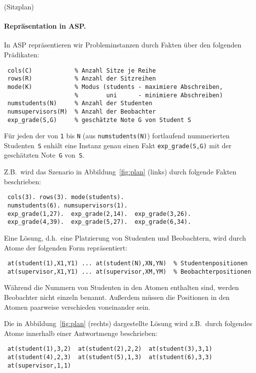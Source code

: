 \documentclass[a4paper,12pt,ngerman]{article}
\begin{document}
\begin{PraktikumsAufgabe}{2}{(Sitzplan)}
\paragraph{Repräsentation in ASP.}

In ASP repräsentieren wir Probleminstanzen durch Fakten
über den folgenden Prädikaten:
\vspace{-1mm}
\begin{verbatim}
 cols(C)            % Anzahl Sitze je Reihe
 rows(R)            % Anzahl der Sitzreihen
 mode(K)            % Modus (students - maximiere Abschreiben,
                    %        uni      - minimiere Abschreiben)
 numstudents(N)     % Anzahl der Studenten
 numsupervisors(M)  % Anzahl der Beobachter
 exp_grade(S,G)     % geschätzte Note G von Student S
\end{verbatim}
\vspace{-1mm}
Für jeden der von \texttt{1} bis \texttt{N} (aus \texttt{numstudents(N)})
fortlaufend nummerierten Studenten~\texttt{S} enhält eine Instanz genau
einen Fakt \texttt{exp\_grade(S,G)} mit der geschätzten Note~\texttt{G} von~\texttt{S}.

\noindent
Z.B.\ wird das Szenario in Abbildung~\ref{fig:plan} (links) %
durch folgende Fakten beschrieben:
\vspace{-1mm}
\begin{verbatim}
 cols(3). rows(3). mode(students).
 numstudents(6). numsupervisors(1).
 exp_grade(1,27).  exp_grade(2,14).  exp_grade(3,26).
 exp_grade(4,39).  exp_grade(5,27).  exp_grade(6,34).
\end{verbatim}

\noindent
Eine Lösung, d.h.\ eine Platzierung von Studenten und Beobachtern,
wird durch Atome der folgenden Form repräsentiert:%
\vspace{-1mm}
\begin{verbatim}
 at(student(1),X1,Y1) ... at(student(N),XN,YN)  % Studentenpositionen
 at(supervisor,X1,Y1) ... at(supervisor,XM,YM)  % Beobachterpositionen
\end{verbatim}
\vspace{-1mm}
Während die Nummern von Studenten in den Atomen enthalten sind,
werden Beobachter nicht einzeln benannt.
Außerdem müssen die Positionen in den Atomen paarweise ver\-schie\-den voneinander sein.

\noindent
Die in Abbildung~\ref{fig:plan} (rechts) dargestellte Lösung wird z.B.\
durch folgendes Atome innerhalb einer Antwortmenge beschrieben:
\vspace{-1mm}
\begin{verbatim}
 at(student(1),3,2)  at(student(2),2,2)  at(student(3),3,1)
 at(student(4),2,3)  at(student(5),1,3)  at(student(6),3,3)
 at(supervisor,1,1)
\end{verbatim}


\end{PraktikumsAufgabe}
\end{document}
